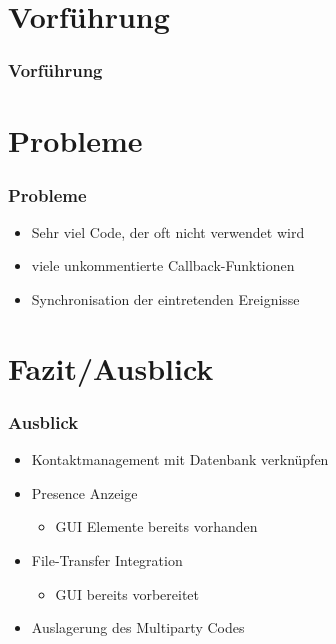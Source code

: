 \documentclass{beamer}
\begin{document}
\section{Vorführung}
		\begin{frame}
			\frametitle{Vorführung}
			\href{run:/Users/dannyk/Desktop/test.txt}
				{}
		\end{frame}

\section{Probleme}
		\begin{frame}
			\frametitle{Probleme}
			\begin{itemize}
				\item Sehr viel Code, der oft nicht verwendet wird
				\item viele unkommentierte Callback-Funktionen 
				\item Synchronisation der eintretenden Ereignisse
			\end{itemize}
		\end{frame}

\section{Fazit/Ausblick}
	\begin{frame}
		\frametitle{Ausblick}
		\begin{itemize}[<+->]
			\item Kontaktmanagement mit Datenbank verknüpfen
			\item Presence Anzeige
			\begin{itemize}[<2->]
				\item GUI Elemente bereits vorhanden
			\end{itemize}
			\item File-Transfer Integration
			\begin{itemize}[<2->]
				\item GUI bereits vorbereitet
			\end{itemize}
			\item Auslagerung des Multiparty Codes
		\end{itemize}
	\end{frame}
\end{document}

